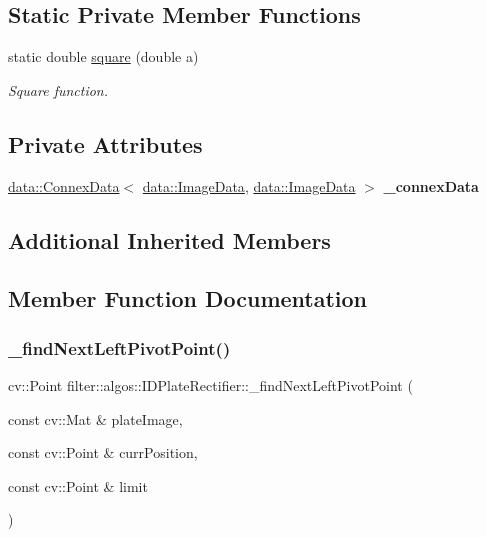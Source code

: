 \subsection*{Static Private Member Functions}
\begin{DoxyCompactItemize}
\item 
static double \hyperlink{classfilter_1_1algos_1_1_i_d_plate_rectifier_afdcacb5df472665d8e9dc7635e3474bf}{square} (double a)
\begin{DoxyCompactList}\small\item\em Square function. \end{DoxyCompactList}\end{DoxyCompactItemize}
\subsection*{Private Attributes}
\begin{DoxyCompactItemize}
\item 
\mbox{\label{classfilter_1_1algos_1_1_i_d_plate_rectifier_a62006521981408467e119aa2674dcf9f}} 
\hyperlink{classfilter_1_1data_1_1_connex_data}{data\+::\+Connex\+Data}$<$ \hyperlink{classfilter_1_1data_1_1_image_data}{data\+::\+Image\+Data}, \hyperlink{classfilter_1_1data_1_1_image_data}{data\+::\+Image\+Data} $>$ {\bfseries \+\_\+connex\+Data}
\end{DoxyCompactItemize}
\subsection*{Additional Inherited Members}


\subsection{Member Function Documentation}
\mbox{\label{classfilter_1_1algos_1_1_i_d_plate_rectifier_a51c36573b499d41e0f9b5f96954e8282}} 
\subsubsection{\texorpdfstring{\+\_\+find\+Next\+Left\+Pivot\+Point()}{\_findNextLeftPivotPoint()}}
{\footnotesize\ttfamily cv\+::\+Point filter\+::algos\+::\+I\+D\+Plate\+Rectifier\+::\+\_\+find\+Next\+Left\+Pivot\+Point (\begin{DoxyParamCaption}\item[{const cv\+::\+Mat \&}]{plate\+Image,  }\item[{const cv\+::\+Point \&}]{curr\+Position,  }\item[{const cv\+::\+Point \&}]{limit }\end{DoxyParamCaption})\hspace{0.3cm}{\ttfamily [private]}}


